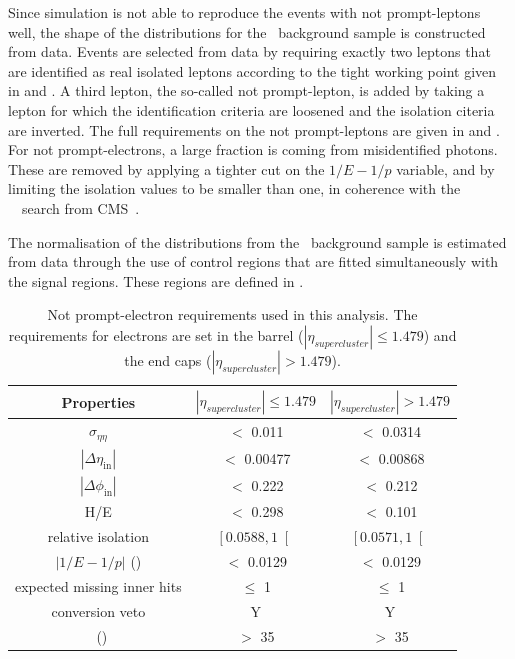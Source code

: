 Since simulation is not able to reproduce the events with not prompt-leptons well, the shape of the distributions for the \NPL\ background sample is constructed from data. Events are selected from data by requiring exactly  two leptons that are identified as real isolated leptons according to the tight working point given in  and . A third lepton, the so-called not prompt-lepton,  is added by taking a lepton for which the identification criteria are loosened and the isolation citeria are inverted. The full  requirements on the not prompt-leptons are given in  and . For not prompt-electrons, a large fraction is coming from misidentified photons. These are removed by applying a tighter cut on the $1/E-1/p$ variable, and by limiting the isolation values to be smaller than one, in coherence with the \SM\ \tZq\ search from CMS~\cite{CMS-PAS-TOP-16-020}. 

The normalisation of the distributions from the \NPL\ background sample is estimated from data through the use of control regions that are fitted simultaneously with the signal regions. These regions are defined in .
\begin{table}[htbp]
	\centering
	
	\caption{Not prompt-electron requirements used in this analysis. The requirements for electrons are set in the barrel ($|\eta_{supercluster}| \leq 1.479$)
		and the end caps ($|\eta_{supercluster}| > 1.479$). }
	\begin{tabular}{ccc}
		\toprule
	 Properties	& \multicolumn{1}{c}{$|\eta_{supercluster}| \leq 1.479$ } & \multicolumn{1}{c}{$|\eta_{supercluster}| > 1.479$ } \\
		\midrule
		$\sigma_{\eta \eta}$ & $<$ 0.011 & $<$ 0.0314 \\ 
		
		$|\Delta\eta_{\mathrm{in}}|$ & $<$ 0.00477& $<$ 0.00868\\ 
		
		$|\Delta\phi_{\mathrm{in}}|$ & $<$ 0.222 &  $<$ 0.212 \\ 
		 
		H/E & $<$ 0.298& $<$ 0.101 \\ 
		
		relative isolation & $\left[ 0.0588  , 1\right[$ &  $\left[ 0.0571, 1\right[$\\ 
	
		$|1/E-1/p|$ (\GeVinv) & $<$ 0.0129  & $<$ 0.0129  \\ 
		
		expected missing inner hits & $\leq $ 1 &  $\leq $ 1\\ 
	
		 conversion veto & Y & Y \\ 
	
		\pt\ (\GeV) &$>$ 35 & $>$ 35  \\
		\bottomrule
	\end{tabular} 
	\label{tab:nonpromptel}
\end{table}

